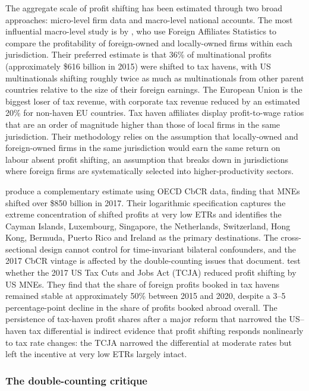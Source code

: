 \documentclass[11pt,a4paper]{article}
\begin{document}
The aggregate scale of profit shifting has been estimated through two broad approaches: micro-level firm data and macro-level national accounts. The most influential macro-level study is by \citet{torslov2023}, who use Foreign Affiliates Statistics to compare the profitability of foreign-owned and locally-owned firms within each jurisdiction. Their preferred estimate is that 36\% of multinational profits (approximately \$616 billion in 2015) were shifted to tax havens, with US multinationals shifting roughly twice as much as multinationals from other parent countries relative to the size of their foreign earnings. The European Union is the biggest loser of tax revenue, with corporate tax revenue reduced by an estimated 20\% for non-haven EU countries. Tax haven affiliates display profit-to-wage ratios that are an order of magnitude higher than those of local firms in the same jurisdiction. Their methodology relies on the assumption that locally-owned and foreign-owned firms in the same jurisdiction would earn the same return on labour absent profit shifting, an assumption that breaks down in jurisdictions where foreign firms are systematically selected into higher-productivity sectors.

\citet{garcia-bernardo2024} produce a complementary estimate using OECD CbCR data, finding that MNEs shifted over \$850 billion in 2017. Their logarithmic specification captures the extreme concentration of shifted profits at very low ETRs and identifies the Cayman Islands, Luxembourg, Singapore, the Netherlands, Switzerland, Hong Kong, Bermuda, Puerto Rico and Ireland as the primary destinations. The cross-sectional design cannot control for time-invariant bilateral confounders, and the 2017 CbCR vintage is affected by the double-counting issues that \citet{blouin2023} document. \citet{garcia-bernardo2022a} test whether the 2017 US Tax Cuts and Jobs Act (TCJA) reduced profit shifting by US MNEs. They find that the share of foreign profits booked in tax havens remained stable at approximately 50\% between 2015 and 2020, despite a 3--5 percentage-point decline in the share of profits booked abroad overall. The persistence of tax-haven profit shares after a major reform that narrowed the US--haven tax differential is indirect evidence that profit shifting responds nonlinearly to tax rate changes: the TCJA narrowed the differential at moderate rates but left the incentive at very low ETRs largely intact.

\subsubsection{The double-counting critique}
\end{document}
